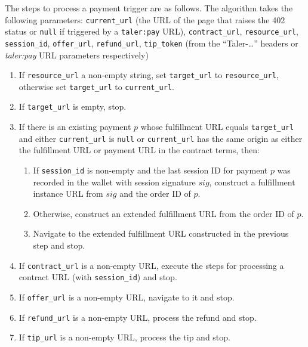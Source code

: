 The steps to process a payment trigger are as follows.  The algorithm takes the
following parameters: \texttt{current\_url} (the URL of the page that
raises the 402 status or \texttt{null} if triggered by a \texttt{taler:pay} URL),
\texttt{contract\_url}, \texttt{resource\_url}, \texttt{session\_id},
\texttt{offer\_url}, \texttt{refund\_url}, \texttt{tip\_token} (from the
``Taler-\dots'' headers or \emph{taler:pay} URL parameters respectively)
\begin{enumerate}
  \item If \texttt{resource\_url} a non-empty string, set \texttt{target\_url} to \texttt{resource\_url},
    otherwise set \texttt{target\_url} to \texttt{current\_url}.
  \item If \texttt{target\_url} is empty, stop.
  \item If there is an existing payment $p$ whose
    fulfillment URL equals \texttt{target\_url} and either \texttt{current\_url} is \texttt{null}
    or \texttt{current\_url} has the same origin as
    either the fulfillment URL or payment URL in the contract terms, then:
    \begin{enumerate}[label*=\arabic*.]
      \item If \texttt{session\_id} is non-empty and the last session ID for payment $p$ was recorded
        in the wallet with session signature $sig$, construct a fulfillment instance URL from $sig$ 
        and the order ID of $p$.
      \item Otherwise, construct an extended fulfillment URL from the order ID of $p$.
      \item Navigate to the extended fulfillment URL constructed in the previous step and stop.
    \end{enumerate}
  \item If \texttt{contract\_url} is a non-empty URL, execute the steps for
    processing a contract URL (with \texttt{session\_id}) and stop.
  \item If \texttt{offer\_url} is a non-empty URL, navigate to it and stop.
  \item If \texttt{refund\_url} is a non-empty URL, process the refund and stop.
  \item If \texttt{tip\_url} is a non-empty URL, process the tip and stop.
\end{enumerate}

